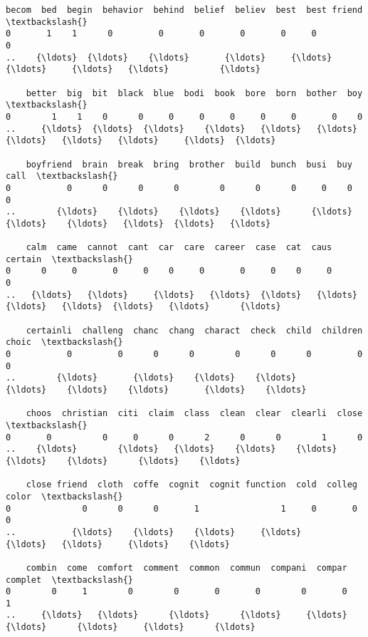 \documentclass[11pt]{article}
\begin{document}
\begin{Verbatim}[commandchars=\\\{\}]
    becom  bed  begin  behavior  behind  belief  believ  best  best friend  \textbackslash{}
0       1    1      0         0       0       0       0     0            0   
..    {\ldots}  {\ldots}    {\ldots}       {\ldots}     {\ldots}     {\ldots}     {\ldots}   {\ldots}          {\ldots}   

    better  big  bit  black  blue  bodi  book  bore  born  bother  boy  \textbackslash{}
0        1    1    0      0     0     0     0     0     0       0    0   
..     {\ldots}  {\ldots}  {\ldots}    {\ldots}   {\ldots}   {\ldots}   {\ldots}   {\ldots}   {\ldots}     {\ldots}  {\ldots}   

    boyfriend  brain  break  bring  brother  build  bunch  busi  buy  call  \textbackslash{}
0           0      0      0      0        0      0      0     0    0     0   
..        {\ldots}    {\ldots}    {\ldots}    {\ldots}      {\ldots}    {\ldots}    {\ldots}   {\ldots}  {\ldots}   {\ldots}   

    calm  came  cannot  cant  car  care  career  case  cat  caus  certain  \textbackslash{}
0      0     0       0     0    0     0       0     0    0     0        0   
..   {\ldots}   {\ldots}     {\ldots}   {\ldots}  {\ldots}   {\ldots}     {\ldots}   {\ldots}  {\ldots}   {\ldots}      {\ldots}   

    certainli  challeng  chanc  chang  charact  check  child  children  choic  \textbackslash{}
0           0         0      0      0        0      0      0         0      0   
..        {\ldots}       {\ldots}    {\ldots}    {\ldots}      {\ldots}    {\ldots}    {\ldots}       {\ldots}    {\ldots}   

    choos  christian  citi  claim  class  clean  clear  clearli  close  \textbackslash{}
0       0          0     0      0      2      0      0        1      0   
..    {\ldots}        {\ldots}   {\ldots}    {\ldots}    {\ldots}    {\ldots}    {\ldots}      {\ldots}    {\ldots}   

    close friend  cloth  coffe  cognit  cognit function  cold  colleg  color  \textbackslash{}
0              0      0      0       1                1     0       0      0   
..           {\ldots}    {\ldots}    {\ldots}     {\ldots}              {\ldots}   {\ldots}     {\ldots}    {\ldots}   

    combin  come  comfort  comment  common  commun  compani  compar  complet  \textbackslash{}
0        0     1        0        0       0       0        0       0        1   
..     {\ldots}   {\ldots}      {\ldots}      {\ldots}     {\ldots}     {\ldots}      {\ldots}     {\ldots}      {\ldots}   


\end{Verbatim}
\end{document}
